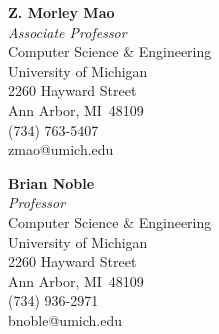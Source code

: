\documentclass[margin,11pt]{res} %
\begin{document}
\textbf{Z. Morley Mao}\\
\emph{Associate Professor}\smallskip\\
Computer Science \& Engineering\\
University of Michigan\\
2260 Hayward Street\\
Ann Arbor, MI \,48109\\
(734) 763-5407\\
zmao@umich.edu
\vspace{6pt}

\textbf{Brian Noble}\\
\emph{Professor}\smallskip\\
Computer Science \& Engineering\\
University of Michigan\\
2260 Hayward Street\\
Ann Arbor, MI \,48109\\
(734) 936-2971\\
bnoble@umich.edu
\vspace{6pt}

\fi
\end{document}
